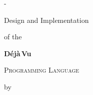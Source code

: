 \begin{titlingpage}
\newlength{\adj}
\calccentering{\adj}
\begin{adjustwidth*}{\adj}{-\adj}
\begin{center}

\vspace*{60pt}

{\fontsize{25}{72}\selectfont Design and Implementation}

\vspace{4pt}

{\fontsize{19}{72}\selectfont of the}

\vspace{11pt}

{\fontsize{76}{72} \textbf{Déjà\,Vu}}

\vspace{8pt}

{\fontsize{22}{72} \textsc{\selectfont Programming Language}}

\vspace{7em}

{\fontsize{18}{72}\selectfont by \theauthor}

\end{center}
\end{adjustwidth*}
\end{titlingpage}


